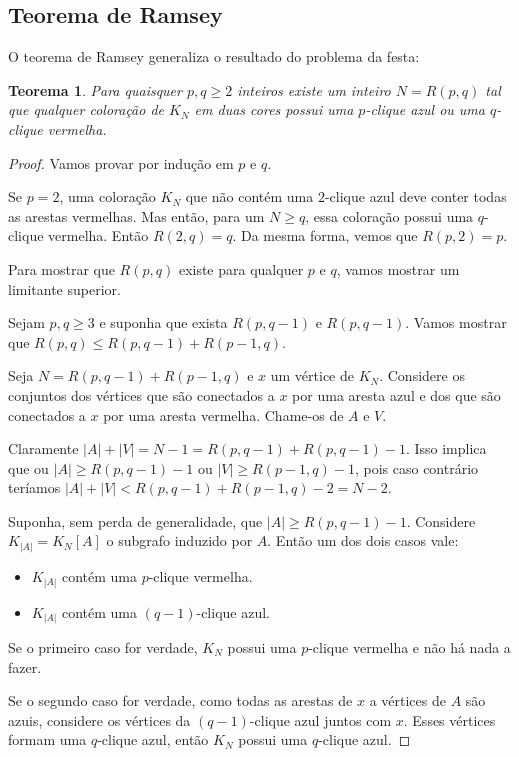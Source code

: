 \documentclass[a4paper]{book}
\newtheorem{teorema}{Teorema}
\begin{document}
\subsection {Teorema de Ramsey}
O teorema de Ramsey generaliza o resultado do problema da festa:

\begin{teorema}
    Para quaisquer $p,q\geq2$ inteiros existe um inteiro $N=R(p,q)$ tal que qualquer coloração de $K_N$ em duas cores possui uma $p$-clique azul ou uma $q$-clique vermelha.
\end{teorema}
\begin{proof}
    Vamos provar por indução em $p$ e $q$.

    Se $p=2$, uma coloração $K_N$ que não contém uma $2$-clique azul deve conter todas as arestas vermelhas. Mas então, para um $N\geq q$, essa coloração possui uma $q$-clique vermelha. Então $R(2,q)=q$. Da mesma forma, vemos que $R(p,2)=p$.

    Para mostrar que $R(p,q)$ existe para qualquer $p$ e $q$, vamos mostrar um limitante superior.

    Sejam $p,q\geq3$ e suponha que exista $R(p,q-1)$ e $R(p,q-1)$. Vamos mostrar que $R(p,q)\leq R(p,q-1)+R(p-1,q)$.

    Seja $N=R(p,q-1)+R(p-1,q)$ e $x$ um vértice de $K_N$. Considere os conjuntos dos vértices que são conectados a $x$ por uma aresta azul e dos que são conectados a $x$ por uma aresta vermelha. Chame-os de $A$ e $V$.

    Claramente $|A|+|V|=N-1=R(p,q-1)+R(p,q-1)-1$. Isso implica que ou $|A|\geq R(p,q-1)-1$ ou $|V|\geq R(p-1,q)-1$, pois caso contrário teríamos $|A|+|V|<R(p,q-1)+R(p-1,q)-2=N-2$.

    Suponha, sem perda de generalidade, que $|A|\geq R(p,q-1)-1$. Considere $K_{|A|}=K_N[A]$ o subgrafo induzido por $A$. Então um dos dois casos vale:
    \begin{itemize}
        \item $K_{|A|}$ contém uma $p$-clique vermelha.
        \item $K_{|A|}$ contém uma $(q-1)$-clique azul.
    \end{itemize}
    Se o primeiro caso for verdade, $K_N$ possui uma $p$-clique vermelha e não há nada a fazer.

    Se o segundo caso for verdade, como todas as arestas de $x$ a vértices de $A$ são azuis, considere os vértices da $(q-1)$-clique azul juntos com $x$. Esses vértices formam uma $q$-clique azul, então $K_N$ possui uma $q$-clique azul.
\end{proof}
\end{document}
